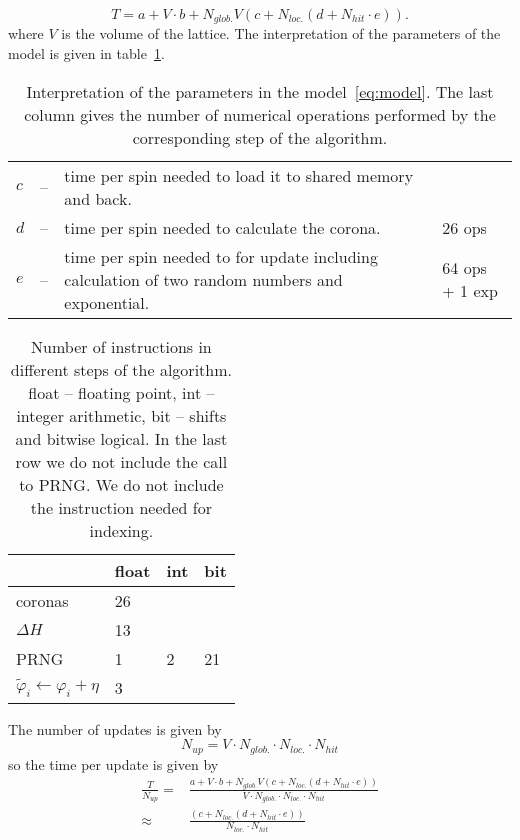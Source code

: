 \documentclass[a4paper]{llncs}
\newcommand{\vphi}{\varphi}
\begin{document}
\begin{equation}\label{eq:model}
T  = a+ V \cdot b +
N_{glob.} V \left(c + N_{loc.}\left(d + N_{hit}\cdot e\right)\right) .
\end{equation}
where $V$ is the volume of the lattice.  The interpretation of the
parameters of the model is given in table~\ref{tab:pars-int}.

\begin{table}
\begin{center} \begin{tabular}{lcp{8cm}p{2cm}}
$c$ &--& time per spin needed to load it to shared memory and back.&\\
$d$ &--& time per spin needed to calculate the corona.& 26 ops\\
$e$ &--& time per spin needed to for update including calculation of two
random numbers and exponential. & 64 ops + 1 exp
\end{tabular}
\end{center}
\caption{\label{tab:pars-int}Interpretation of the parameters in the
model~\ref{eq:model}. The last column gives the number of numerical operations
performed by the corresponding step of the algorithm.}
\end{table}

\begin{table}

\begin{center}
\begin{tabular}{|p{4cm}|l|l|l|}\hline\hline
 & float & int  & bit \\\hline
coronas & 26 & & \\\hline
$\Delta H  $ & 13  & & \\\hline
PRNG & 1 & 2  & 21  \\\hline
$\widetilde{\vphi}_i \gets \vphi_i+\eta$& 3 & &\\\hline\hline
\end{tabular}
\end{center}

\caption{\label{tab:instr-count}Number of instructions in different steps of
the algorithm. float -- floating point, int -- integer arithmetic, bit --
shifts and bitwise logical. In the last row we do not include the call to PRNG.
We do not include the instruction needed for indexing.}

\end{table}

The number of updates is given by
\begin{equation}
N_{up} = V \cdot N_{glob.} \cdot N_{loc.} \cdot N_{hit}
\end{equation}
so the time per update is given by
\begin{equation}\begin{split}
\frac{T}{N_{up}} = &
\frac{ a + V \cdot b + N_{glob.}
       V \left(c + N_{loc.}\left(d + N_{hit}\cdot e\right)\right) }
     { V\cdot N_{glob.}\cdot N_{loc.}\cdot N_{hit} }\\
\approx&
\frac{ \left(c + N_{loc.}\left(d + N_{hit}\cdot e\right)\right) }
     { N_{loc.}\cdot N_{hit} }
\end{split}
\end{equation}
\end{document}
